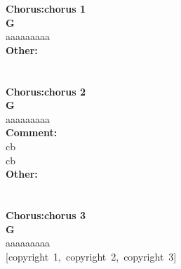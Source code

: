 \documentclass{scrartcl}
\begin{document}
{\textbf{Chorus:chorus 1} \\
\textbf{ \hspace*{8em}G} \\
aaaaaaaaa \\
\textbf{Other:} \\
\textbf{ } \\
 \\
\textbf{Chorus:chorus 2} \\
\textbf{ \hspace*{8em}G} \\
aaaaaaaaa \\
\textbf{Comment:} \\
cb \\
cb \\
\textbf{Other:} \\
\textbf{ } \\
 \\
\textbf{Chorus:chorus 3} \\
\textbf{ \hspace*{8em}G} \\
aaaaaaaaa \\
{[}copyright~1,~copyright~2,~copyright~3{]}
}
\end{document}
